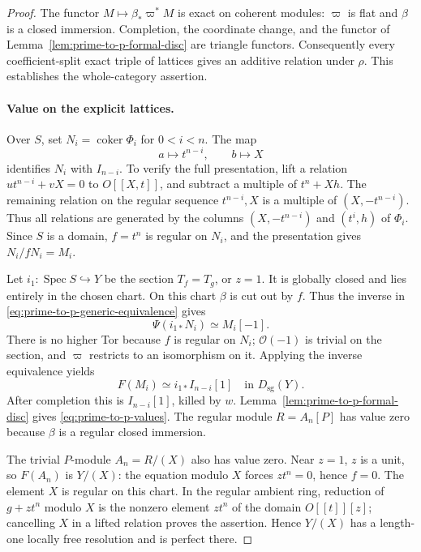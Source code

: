 \begin{proof}
The functor \(M\mapsto\beta_*\varpi^*M\) is exact on coherent modules:
\(\varpi\) is flat and \(\beta\) is a closed immersion.  Completion,
the coordinate change, and the functor of
Lemma~\ref{lem:prime-to-p-formal-disc} are triangle functors.
Consequently every coefficient-split exact triple of lattices gives
an additive relation under \(\rho\).  This establishes the
whole-category assertion.

\paragraph{Value on the explicit lattices.}
Over \(S\), set \(N_i=\operatorname{coker}\Phi_i\) for \(0<i<n\).
The map
\[
 a\longmapsto t^{n-i},\qquad b\longmapsto X
\]
identifies \(N_i\) with \(I_{n-i}\).
To verify the full presentation, lift a relation
\(u t^{n-i}+vX=0\) to \(O[[X,t]]\), and subtract a multiple of
\(t^n+Xh\).  The remaining relation on the regular sequence
\(t^{n-i},X\) is a multiple of \((X,-t^{n-i})\).
Thus all relations are generated by the columns
\((X,-t^{n-i})\) and \((t^i,h)\) of \(\Phi_i\).
Since \(S\) is a domain, \(f=t^n\) is regular on \(N_i\), and
the presentation gives \(N_i/fN_i=M_i\).

Let \(i_1:\operatorname{Spec}S\hookrightarrow Y\) be the section
\(T_f=T_g\), or \(z=1\).  It is globally closed and lies entirely
in the chosen chart.  On this chart \(\beta\) is cut out by \(f\).
Thus the inverse in \eqref{eq:prime-to-p-generic-equivalence} gives
\[
 \Psi(i_{1*}N_i)\simeq M_i[-1].
\]
There is no higher Tor because \(f\) is regular on \(N_i\);
\(\mathcal O(-1)\) is trivial on the section, and \(\varpi\) restricts
to an isomorphism on it.  Applying the inverse equivalence yields
\[
 F(M_i)\simeq i_{1*}I_{n-i}[1]
       \quad\text{in }D_{\mathrm{sg}}(Y).
\]
After completion this is \(I_{n-i}[1]\), killed by \(w\).
Lemma~\ref{lem:prime-to-p-formal-disc} gives
\eqref{eq:prime-to-p-values}.  The regular module \(R=A_n[P]\)
has value zero because \(\beta\) is a regular closed immersion.

The trivial \(P\)-module \(A_n=R/(X)\) also has value zero.
Near \(z=1\), \(z\) is a unit, so \(F(A_n)\) is \(Y/(X)\):
the equation modulo \(X\) forces \(zt^n=0\), hence \(f=0\).
The element \(X\) is regular on this chart.  In the regular
ambient ring, reduction of \(g+zt^n\) modulo \(X\) is the nonzero
element \(zt^n\) of the domain \(O[[t]][z]\); cancelling \(X\)
in a lifted relation proves the assertion.  Hence \(Y/(X)\)
has a length-one locally free resolution and is perfect there.


\end{proof}
